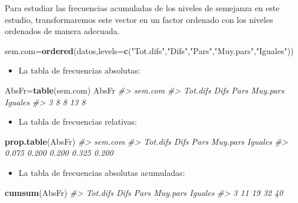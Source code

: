 \documentclass[
]{book}
\newenvironment{Shaded}{\begin{snugshade}}{\end{snugshade}}
\newcommand{\CommentTok}[1]{\textcolor[rgb]{0.56,0.35,0.01}{\textit{#1}}}
\newcommand{\DataTypeTok}[1]{\textcolor[rgb]{0.13,0.29,0.53}{#1}}
\newcommand{\KeywordTok}[1]{\textcolor[rgb]{0.13,0.29,0.53}{\textbf{#1}}}
\newcommand{\NormalTok}[1]{#1}
\newcommand{\StringTok}[1]{\textcolor[rgb]{0.31,0.60,0.02}{#1}}
\providecommand{\tightlist}{%
  \setlength{\itemsep}{0pt}\setlength{\parskip}{0pt}}
\theoremstyle{definition}
\theoremstyle{definition}
\theoremstyle{definition}
\theoremstyle{remark}
\begin{document}
Para estudiar las frecuencias acumuladas de los niveles de semejanza en este estudio, transformaremos este vector en un factor ordenado con los niveles ordenados de manera adecuada.

\begin{Shaded}
\begin{Highlighting}[]
\NormalTok{sem.com=}\KeywordTok{ordered}\NormalTok{(datos,}\DataTypeTok{levels=}\KeywordTok{c}\NormalTok{(}\StringTok{"Tot.difs"}\NormalTok{,}\StringTok{"Difs"}\NormalTok{,}\StringTok{"Pars"}\NormalTok{,}\StringTok{"Muy.pars"}\NormalTok{,}\StringTok{"Iguales"}\NormalTok{))}
\end{Highlighting}
\end{Shaded}

\begin{itemize}
\tightlist
\item
  La tabla de frecuencias absolutas:
\end{itemize}

\begin{Shaded}
\begin{Highlighting}[]
\NormalTok{AbsFr=}\KeywordTok{table}\NormalTok{(sem.com)}
\NormalTok{AbsFr}
\CommentTok{\#\textgreater{} sem.com}
\CommentTok{\#\textgreater{} Tot.difs     Difs     Pars Muy.pars  Iguales }
\CommentTok{\#\textgreater{}        3        8        8       13        8}
\end{Highlighting}
\end{Shaded}

\begin{itemize}
\tightlist
\item
  La tabla de frecuencias relativas:
\end{itemize}

\begin{Shaded}
\begin{Highlighting}[]
\KeywordTok{prop.table}\NormalTok{(AbsFr)}
\CommentTok{\#\textgreater{} sem.com}
\CommentTok{\#\textgreater{} Tot.difs     Difs     Pars Muy.pars  Iguales }
\CommentTok{\#\textgreater{}    0.075    0.200    0.200    0.325    0.200}
\end{Highlighting}
\end{Shaded}

\begin{itemize}
\tightlist
\item
  La tabla de frecuencias absolutas acumuladas:
\end{itemize}

\begin{Shaded}
\begin{Highlighting}[]
\KeywordTok{cumsum}\NormalTok{(AbsFr)}
\CommentTok{\#\textgreater{} Tot.difs     Difs     Pars Muy.pars  Iguales }
\CommentTok{\#\textgreater{}        3       11       19       32       40}
\end{Highlighting}
\end{Shaded}
\end{document}
